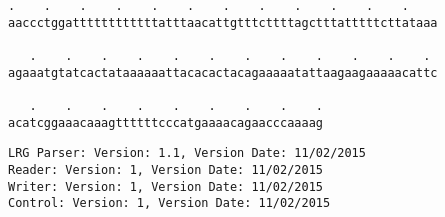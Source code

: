\documentclass{article}
\begin{document}
\newpage
\begin{Verbatim}[fontfamily=courier]
   .    .    .    .    .    .    .    .    .    .    .    . 
aaccctggattttttttttttatttaacattgtttcttttagctttatttttcttataaa

   .    .    .    .    .    .    .    .    .    .    .    . 
agaaatgtatcactataaaaaattacacactacagaaaaatattaagaagaaaaacattc

   .    .    .    .    .    .    .    .    .
acatcggaaacaaagttttttcccatgaaaacagaacccaaaag
\end{Verbatim}
\newpage
\begin{Verbatim}[fontfamily=courier]
LRG Parser: Version: 1.1, Version Date: 11/02/2015
Reader: Version: 1, Version Date: 11/02/2015
Writer: Version: 1, Version Date: 11/02/2015
Control: Version: 1, Version Date: 11/02/2015
\end{Verbatim}
\end{document}
